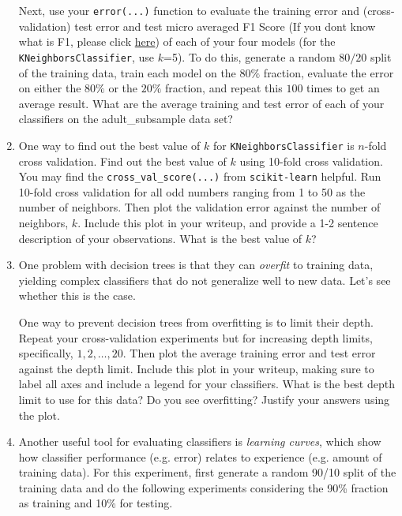 \begin{enumerate}[resume]
Next, use your \verb|error(...)| function to evaluate the training error and (cross-validation) test error and test micro averaged F1 Score (If you dont know what is F1, please click \href{https://scikit-learn.org/stable/modules/generated/sklearn.metrics.f1_score.html?highlight=f1\%20score#sklearn.metrics.f1_score}{here}) of each of your four models (for the \verb|KNeighborsClassifier|, use $k$=5). To do this, generate a random $80/20$ split of the training data, train each model on the $80\%$ fraction, evaluate the error on either the $80\%$ or the $20\%$ fraction, and repeat this $100$ times to get an average result. What are the average training and test error of each of your classifiers on the adult\_subsample data set?

\solution{}


\item {} One way to find out the best value of $k$ for \verb|KNeighborsClassifier| is $n$-fold cross validation.
Find out the best value of $k$ using 10-fold cross validation. You may find the \verb|cross_val_score(...)| from \verb|scikit-learn| helpful. Run 10-fold cross validation for all odd numbers ranging from 1 to 50 as the number of neighbors.
Then plot the validation error against the number of neighbors, $k$.
Include this plot in your writeup, and provide a 1-2 sentence description of your observations. What is the best value of $k$?

\solution{}

\item {} One problem with decision trees is that they can \emph{overfit} to training data, yielding complex classifiers that do not generalize well to new data. Let's see whether this is the case.

One way to prevent decision trees from overfitting is to limit their depth. Repeat your cross-validation experiments but for increasing depth limits, specifically, $1,2,\ldots,20$. Then plot the average training error and test error against the depth limit. 
Include this plot in your writeup, making sure to label all axes and include a legend for your classifiers. What is the best depth limit to use for this data? Do you see overfitting? Justify your answers using the plot.

\solution{}

\item {} Another useful tool for evaluating classifiers is \emph{learning curves}, which show how classifier performance (e.g. error) relates to experience (e.g. amount of training data).
For this experiment, first generate a random 90/10 split of the training data and do the following experiments considering the 90\% fraction as training and 10\% for testing. 


\end{enumerate}
